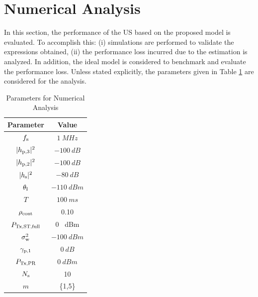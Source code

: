 {%
\section{Numerical Analysis} \label{sec:num_ana}
In this section, the performance of the US based on the proposed model is evaluated. To accomplish this: (i) simulations are performed to validate the expressions obtained, (ii) the performance loss incurred due to the estimation is analyzed. In addition, the ideal model is considered to benchmark and evaluate the performance loss. %
Unless stated explicitly, the parameters given in Table \ref{tb:tb2} are considered for the analysis.%



\begin{table}
\renewcommand{\arraystretch}{1.4}
\caption{Parameters for Numerical Analysis}
\label{tb:tb2}
\centering
\begin{tabular}{c||c}
\hline
\bfseries Parameter & \bfseries Value \\
\hline\hline
$f_{\text{s}}$  & $\SI{1}{MHz}$ \\ 
$|h_{\text{p,3}}|^2$ & $\SI{-100}{dB}$ \\ 
$|h_{\text{p,2}}|^2$ & $\SI{-100}{dB}$ \\ 
$|h_{\text{s}}|^2$ & $\SI{-80}{dB}$ \\ 
$\theta_{\text{I}}$ & $\SI{-110}{dBm}$ \\ 
$T$ & $\SI{100}{ms}$ \\ 
$\rho_{\text{cont}}$ & 0.10 \\ 
$P_{\text{Tx,ST,full}}$ & 0 \SI{}{dBm} \\ 
$\sigma^2_{\text{w}}$ & $\SI{-100}{dBm}$ \\ 
${\gamma}_{\text{p,1}}$ & $\SI{0}{dB}$ \\ 
$P_{\text{Tx,PR}}$ & $\SI{0}{dBm}$ \\ 
$N_{\text{s}}$ & 10 \\ 
$m$ & \{1,5\} \\ \hline
\end{tabular}%
\end{table}

}
